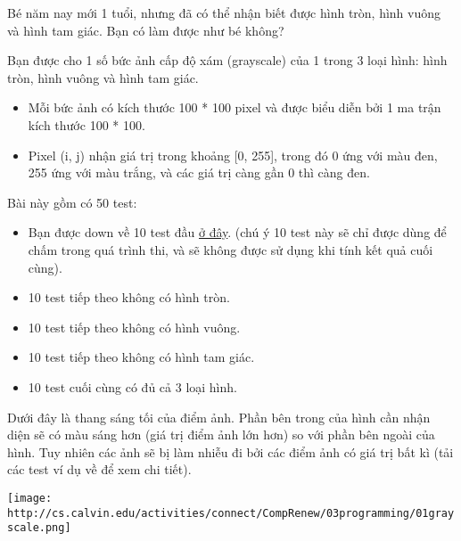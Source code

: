 Bé năm nay mới 1 tuổi, nhưng đã có thể nhận biết được hình tròn, hình vuông và hình tam giác. Bạn có làm được như bé không?

Bạn được cho 1 số bức ảnh cấp độ xám (grayscale) của 1 trong 3 loại hình: hình tròn, hình vuông và hình tam giác.
\begin{itemize}
	\item Mỗi bức ảnh có kích thước 100 * 100 pixel và được biểu diễn bởi 1 ma trận kích thước 100 * 100.
	\item Pixel (i, j) nhận giá trị trong khoảng [0, 255], trong đó 0 ứng với màu đen, 255 ứng với màu trắng, và các giá trị càng gần 0 thì càng đen.
\end{itemize}

Bài này gồm có 50 test:
\begin{itemize}
	\item Bạn được down về 10 test đầu \href{https://www.dropbox.com/s/rmiayackco34itk/Archive.zip?dl=0}{ở đây}. (chú ý 10 test này sẽ chỉ được dùng để chấm trong quá trình thi, và sẽ không được sử dụng khi tính kết quả cuối cùng).
	\item 10 test tiếp theo không có hình tròn.
	\item 10 test tiếp theo không có hình vuông.
	\item 10 test tiếp theo không có hình tam giác.
	\item 10 test cuối cùng có đủ cả 3 loại hình.
\end{itemize}

Dưới đây là thang sáng tối của điểm ảnh. Phần bên trong của hình cần nhận diện sẽ có màu sáng hơn (giá trị điểm ảnh lớn hơn) so với phần bên ngoài của hình. Tuy nhiên các ảnh sẽ bị làm nhiễu đi bởi các điểm ảnh có giá trị bất kì (tải các test ví dụ về để xem chi tiết).


\texttt{[image: http://cs.calvin.edu/activities/connect/CompRenew/03programming/01grayscale.png]}